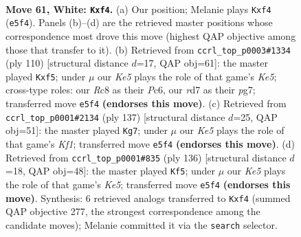 \documentclass[11pt]{article}
\begin{document}
\clearpage

\begin{figure}[p]\centering
\begin{subfigure}{0.46\textwidth}\centering
\resizebox{\linewidth}{!}{%
\newchessgame
\chessboard[
  setfen={2R5/3r2k1/8/p3K2r/5p2/1P6/3p3P/R7 w - - 0 61},
  showmover=false,
  pgfstyle=straightmove, color=movearrow, markmove={e5-f4}
]}
\caption{}
\end{subfigure}\hfill
\begin{subfigure}{0.46\textwidth}\centering
\resizebox{\linewidth}{!}{%
\newchessgame
\chessboard[
  setfen={8/4k1p1/p1P3P1/4Kp2/8/P3r2p/3R4/8 w - - 2 56},
  showmover=false,
  pgfstyle=straightmove, color=movearrow, markmove={e5-f5}
]}
\caption{}
\end{subfigure}
\\[4pt]
\begin{subfigure}{0.46\textwidth}\centering
\resizebox{\linewidth}{!}{%
\newchessgame
\chessboard[
  setfen={5k2/8/7r/1p1p4/3P1R2/2r5/1R4K1/8 b - - 0 69},
  showmover=false,
  pgfstyle=straightmove, color=movearrow, markmove={f8-g7}
]}
\caption{}
\end{subfigure}\hfill
\begin{subfigure}{0.46\textwidth}\centering
\resizebox{\linewidth}{!}{%
\newchessgame
\chessboard[
  setfen={8/3r1k2/2R5/4K1pP/2p5/2P1r3/8/R7 w - - 6 69},
  showmover=false,
  pgfstyle=straightmove, color=movearrow, markmove={e5-f5}
]}
\caption{}
\end{subfigure}
\caption{\textbf{Move 61, White: \texttt{Kxf4}.} (a) Our position; Melanie plays \texttt{Kxf4} (\texttt{e5f4}). Panels (b)--(d) are the retrieved master positions whose correspondence most drove this move (highest QAP objective among those that transfer to it). (b) Retrieved from \texttt{ccrl\_top\_p0003\#1334} (ply 110) [structural distance $d$=17, QAP obj=61]: the master played \texttt{Kxf5}; under $\mu$ our \emph{Ke5} plays the role of that game's \emph{Ke5}; cross-type roles: our \emph{R}c8 as their \emph{P}c6, our \emph{r}d7 as their \emph{p}g7; transferred move \texttt{e5f4} \textbf{(endorses this move)}. (c) Retrieved from \texttt{ccrl\_top\_p0001\#2134} (ply 137) [structural distance $d$=25, QAP obj=51]: the master played \texttt{Kg7}; under $\mu$ our \emph{Ke5} plays the role of that game's \emph{Kf1}; transferred move \texttt{e5f4} \textbf{(endorses this move)}. (d) Retrieved from \texttt{ccrl\_top\_p0001\#835} (ply 136) [structural distance $d$=18, QAP obj=48]: the master played \texttt{Kf5}; under $\mu$ our \emph{Ke5} plays the role of that game's \emph{Ke5}; transferred move \texttt{e5f4} \textbf{(endorses this move)}. Synthesis: 6 retrieved analogs transferred to \texttt{Kxf4} (summed QAP objective 277, the strongest correspondence among the candidate moves); Melanie committed it via the \texttt{search} selector.}
\label{fig:thought-m120}
\end{figure}
\end{document}

